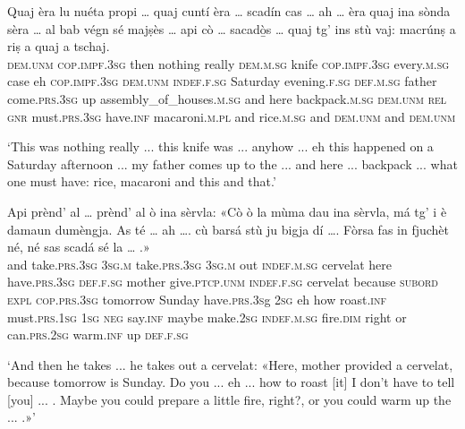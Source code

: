 \begin{linenumbers}
	\gll Quaj èra lu nuéta propi … quaj cuntí èra … scadín cas … ah … èra quaj ina sònda sèra … al bab végn sé majṣès … api cò … sacadò̱s … quaj tg’ ins stù vaj: macrúnṣ a riṣ a quaj a tschaj.   \\
	\textsc{dem.unm} \textsc{cop.impf.3sg} then nothing really {} \textsc{dem.m.sg} knife \textsc{cop.impf.3sg} {} every.\textsc{m.sg} case {} eh {} \textsc{cop.impf.3sg} \textsc{dem.unm} \textsc{indef.f.sg} Saturday evening.\textsc{f.sg} {} \textsc{def.m.sg} father come.\textsc{prs.3sg} up assembly\_of\_houses.\textsc{m.sg} {} and here {}  backpack.\textsc{m.sg} {} \textsc{dem.unm} \textsc{rel} \textsc{gnr} must.\textsc{prs.3sg} have.\textsc{inf} macaroni.\textsc{m.pl} and rice.\textsc{m.sg} and \textsc{dem.unm} and \textsc{dem.unm} \\
\end{linenumbers}
\medskip
\glt `This was nothing really ... this knife was ... anyhow ... eh this happened on a Saturday afternoon ... my father comes up to the ... and here ... backpack ... what one must have: rice, macaroni and this and that.'
\medskip

\begin{linenumbers}
	\gll Api prènd' al … prènd' al ò ina sèrvla: «Cò ò la mùma dau ina sèrvla, má tg’ i è damaun dumèngja. As té … ah …. cù barsá stù ju bigja dí …. Fòrsa fas in fjuchèt né, né sas scadá sé la … .»\\
	and take.\textsc{prs.3sg} \textsc{3sg.m} {} take.\textsc{prs.3sg} \textsc{3sg.m} out \textsc{indef.m.sg} cervelat\footnotemark{} here have.\textsc{prs.3sg} \textsc{def.f.sg} mother give.\textsc{ptcp.unm} \textsc{indef.f.sg} cervelat because \textsc{subord} \textsc{expl} \textsc{cop.prs.3sg} tomorrow Sunday have.\textsc{prs.3s}g \textsc{2sg} {} eh {} how roast.\textsc{inf} must.\textsc{prs.1sg} \textsc{1sg} \textsc{neg} say.\textsc{inf} {} maybe make.\textsc{2sg} \textsc{indef.m.sg} fire.\textsc{dim} right or can.\textsc{prs.2sg} warm.\textsc{inf} up \textsc{def.f.sg}  \\
\end{linenumbers}
\medskip
\glt `And then he takes ... he takes out a cervelat: «Here, mother provided a cervelat, because tomorrow is Sunday. Do you ... eh ... how to roast [it] I don't have to tell [you] ... . Maybe you could prepare a little fire, right?, or you could warm up the ... .»'
\medskip

